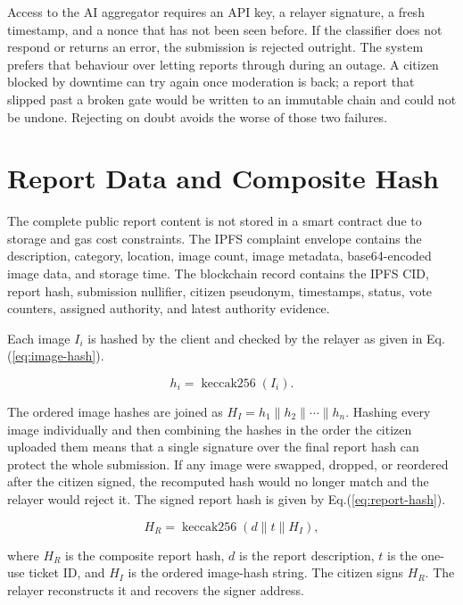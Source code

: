 Access to the \ac{AI} aggregator requires an \ac{API} key, a relayer signature, a fresh timestamp, and a nonce that has not been seen before. If the classifier does not respond or returns an error, the submission is rejected outright. The system prefers that behaviour over letting reports through during an outage. A citizen blocked by downtime can try again once moderation is back; a report that slipped past a broken gate would be written to an immutable chain and could not be undone. Rejecting on doubt avoids the worse of those two failures.

\section{Report Data and Composite Hash}
\label{sec:report-data-hash}

The complete public report content is not stored in a smart contract due to storage and gas cost constraints. The IPFS complaint envelope contains the description, category, location, image count, image metadata, base64-encoded image data, and storage time. The blockchain record contains the IPFS CID, report hash, submission nullifier, citizen pseudonym, timestamps, status, vote counters, assigned authority, and latest authority evidence.

Each image \(I_i\) is hashed by the client and checked by the relayer as given in Eq.(\ref{eq:image-hash}).

\begin{equation}
    h_i = \operatorname{keccak256}(I_i).
    \label{eq:image-hash}
\end{equation}

The ordered image hashes are joined as \(H_I=h_1\parallel h_2\parallel\cdots\parallel h_n\). Hashing every image individually and then combining the hashes in the order the citizen uploaded them means that a single signature over the final report hash can protect the whole submission. If any image were swapped, dropped, or reordered after the citizen signed, the recomputed hash would no longer match and the relayer would reject it. The signed report hash is given by Eq.(\ref{eq:report-hash}).

\begin{equation}
    H_R = \operatorname{keccak256}\left(d \parallel t \parallel H_I\right),
    \label{eq:report-hash}
\end{equation}

where \(H_R\) is the composite report hash, \(d\) is the report description, \(t\) is the one-use ticket ID, and \(H_I\) is the ordered image-hash string. The citizen signs \(H_R\). The relayer reconstructs it and recovers the signer address. 

